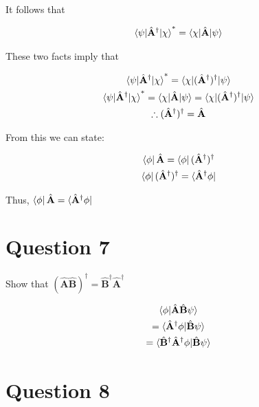 \documentclass{article}
\let\oldhat\hat
\renewcommand{\hat}[1]{\oldhat{\mathbf{#1}}}
\begin{document}
It follows that

\begin{gather}
    \braket{\psi|\hat{A}^\dagger|\chi}^* = \braket{\chi|\hat{A}|\psi}
\end{gather}

These two facts imply that

\begin{gather}
    \braket{\psi|\hat{A}^\dagger|\chi}^* = \braket{\chi|(\hat{A}^\dagger)^\dagger|\psi}\\
    \braket{\psi|\hat{A}^\dagger|\chi}^* = \braket{\chi|\hat{A}|\psi} = \braket{\chi|(\hat{A}^\dagger)^\dagger|\psi}\\
    \therefore (\hat{A}^{\dagger})^{\dagger} = \hat{A}
\end{gather}

\vspace{2cm}

From this we can state:


\begin{gather}
    \bra{\phi}\hat{A} = \bra{\phi}(\hat{A}^{\dagger})^{\dagger}\\
    \bra{\phi}(\hat{A}^{\dagger})^{\dagger} = \bra{\hat{A}^{\dagger}\phi}
\end{gather}
\begin{center}
    Thus, $\bra{\phi}\hat{A} = \bra{\hat{A}^{\dagger}\phi}$
\end{center}




\section{Question 7}

    Show that $(\hat{A}\hat{B})^\dagger = \hat{B}^\dagger \hat{A}^\dagger$

    \begin{gather}
        \braket{\phi | \hat{A}\hat{B}\psi}\\
        = \braket{\hat{A}^\dagger \phi | \hat{B}\psi}\\
        = \braket{\hat{B}^\dagger\hat{A}^\dagger \phi | \hat{B}\psi}
    \end{gather}


\section{Question 8}
\end{document}
